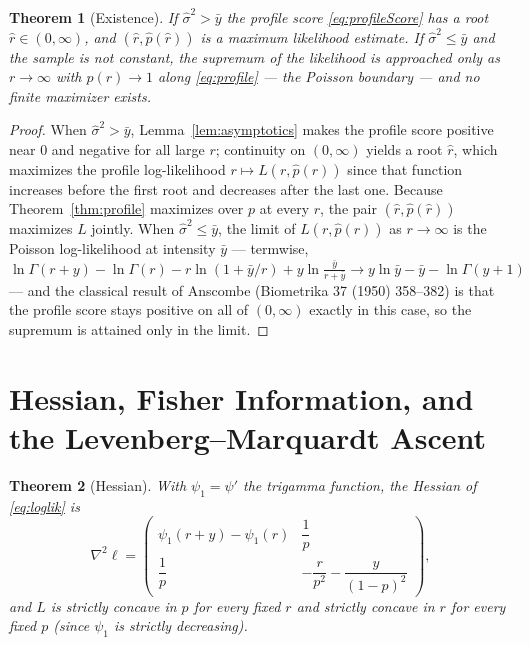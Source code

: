 \documentclass[11pt]{article}
\newtheorem{theorem}{Theorem}[section]
\begin{document}
\begin{theorem}[Existence]\label{thm:existence}
If $\hat\sigma^{2}>\bar y$ the profile score \eqref{eq:profileScore} has a
root $\hat r\in(0,\infty)$, and $(\hat r,\hat p(\hat r))$ is a maximum
likelihood estimate. If $\hat\sigma^{2}\le\bar y$ and the sample is not
constant, the supremum of the likelihood is approached only as
$r\to\infty$ with $\hat p(r)\to1$ along \eqref{eq:profile} — the Poisson
boundary — and no finite maximizer exists.
\end{theorem}

\begin{proof}
When $\hat\sigma^{2}>\bar y$, Lemma~\ref{lem:asymptotics} makes the profile
score positive near $0$ and negative for all large $r$; continuity on
$(0,\infty)$ yields a root $\hat r$, which maximizes the profile
log-likelihood $r\mapsto L(r,\hat p(r))$ since that function increases
before the first root and decreases after the last one. Because
Theorem~\ref{thm:profile} maximizes over $p$ at every $r$, the pair
$(\hat r,\hat p(\hat r))$ maximizes $L$ jointly. When
$\hat\sigma^{2}\le\bar y$, the limit of $L(r,\hat p(r))$ as $r\to\infty$ is
the Poisson log-likelihood at intensity $\bar y$ — termwise,
$\ln\Gamma(r+y)-\ln\Gamma(r)-r\ln(1+\bar y/r)+y\ln\frac{\bar y}{r+\bar y}
\to y\ln\bar y-\bar y-\ln\Gamma(y+1)$ — and the classical result of
Anscombe (Biometrika 37 (1950) 358--382) is that the profile score stays
positive on all of $(0,\infty)$ exactly in this case, so the supremum is
attained only in the limit.
\end{proof}

\section{Hessian, Fisher Information, and the Levenberg--Marquardt Ascent}

\begin{theorem}[Hessian]\label{thm:hessian}
With $\psi_{1}=\psi'$ the trigamma function, the Hessian of
\eqref{eq:loglik} is
\begin{equation}
\nabla^{2}\ell=
\begin{pmatrix}
\psi_{1}(r+y)-\psi_{1}(r) & \dfrac1p\\[1.2ex]
\dfrac1p & -\dfrac{r}{p^{2}}-\dfrac{y}{(1-p)^{2}}
\end{pmatrix},
\label{eq:hessian}
\end{equation}
and $L$ is strictly concave in $p$ for every fixed $r$ and strictly concave
in $r$ for every fixed $p$ (since $\psi_{1}$ is strictly decreasing).
\end{theorem}
\end{document}
